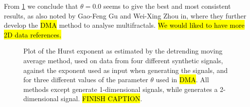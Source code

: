 From \cref{fig:dma_performace} we conclude that $\theta = 0.0$ seems to give the best and most consistent results, as also noted by Gao-Feng Gu and Wei-Xing Zhou in\cite{gu2010detrending}, where they further develop the \hl{DMA} method to analyse multifractals. \hl{We would liked to have more 2D data references.}%
%
\begin{figure}[htpb]%
    \centering%
    {
        \newcommand{\f}{\footnotesize}%
        \newcommand{\x}{\text}%
        \newcommand{\thislabelaaaaaa}{{\f $H_\x{in}=H_\x{out}$}}%
    }
    \caption{%
        Plot of the Hurst exponent as estimated by the detrending moving average method, used on data from four different synthetic signals, against the exponent used as input when generating the signals, and for three different values of the parameter $\theta$ used in \hl{DMA}. All methods except  generate 1-dimensional signals, while  generates a 2-dimensional signal. \hl{FINISH CAPTION}. %
        \label{fig:dma_performace}%
    }%
\end{figure}%

